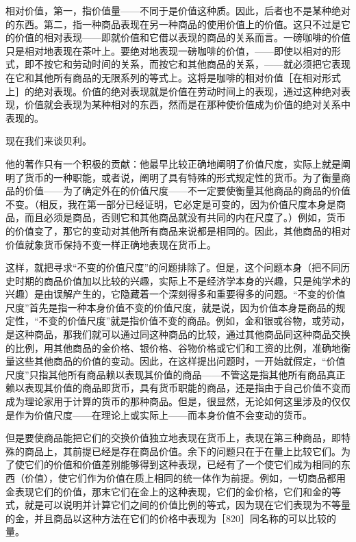 相对价值，第一，指价值量——不同于是价值这种质。因此，后者也不是某种绝对的东西。第二，指一种商品表现在另一种商品的使用价值上的价值。这只不过是它的价值的相对表现——即就价值和它借以表现的商品的关系而言。一磅咖啡的价值只是相对地表现在茶叶上。要绝对地表现一磅咖啡的价值，——即使以相对的形式，即不按它和劳动时间的关系，而按它和其他商品的关系，——就必须把它表现在它和其他所有商品的无限系列的等式上。这将是咖啡的相对价值［在相对形式上］的绝对表现。价值的绝对表现就是价值在劳动时间上的表现，通过这种绝对表现，价值就会表现为某种相对的东西，然而是在那种使价值成为价值的绝对关系中表现的。


现在我们来谈贝利。

他的著作只有一个积极的贡献：他最早比较正确地阐明了价值尺度，实际上就是阐明了货币的一种职能，或者说，阐明了具有特殊的形式规定性的货币。为了衡量商品的价值——为了确定外在的价值尺度——不一定要使衡量其他商品的商品的价值不变。（相反，我在第一部分已经证明，它必定是可变的，因为价值尺度本身是商品，而且必须是商品，否则它和其他商品就没有共同的内在尺度了。）例如，货币的价值变了，那它的变动对其他所有商品来说都是相同的。因此，其他商品的相对价值就象货币保持不变一样正确地表现在货币上。

这样，就把寻求“不变的价值尺度”的问题排除了。但是，这个问题本身（把不同历史时期的商品价值加以比较的兴趣，实际上不是经济学本身的兴趣，只是纯学术的兴趣）是由误解产生的，它隐藏着一个深刻得多和重要得多的问题。“不变的价值尺度”首先是指一种本身价值不变的价值尺度，就是说，因为价值本身是商品的规定性，“不变的价值尺度”就是指价值不变的商品。例如，金和银或谷物，或劳动，是这种商品，那我们就可以通过同这种商品的比较，通过其他商品同这种商品交换的比例，用其他商品的金价格、银价格、谷物价格或它们和工资的比例，准确地衡量这些其他商品的价值的变动。因此，在这样提出问题时，一开始就假定，“价值尺度”只指其他所有商品赖以表现其价值的商品——不管这是指其他所有商品真正赖以表现其价值的商品即货币，具有货币职能的商品，还是指由于自己价值不变而成为理论家用于计算的货币的那种商品。但是，很显然，无论如何这里涉及的仅仅是作为价值尺度——在理论上或实际上——而本身价值不会变动的货币。

但是要使商品能把它们的交换价值独立地表现在货币上，表现在第三种商品，即特殊的商品上，其前提已经是存在商品价值。余下的问题只在于在量上比较它们。为了使它们的价值和价值差别能够得到这种表现，已经有了一个使它们成为相同的东西（价值），使它们作为价值在质上相同的统一体作为前提。例如，一切商品都用金表现它们的价值，那末它们在金上的这种表现，它们的金价格，它们和金的等式，就是可以说明并计算它们之间的价值比例的等式，因为现在它们表现为不等量的金，并且商品以这种方法在它们的价格中表现为［820］同名称的可以比较的量。

